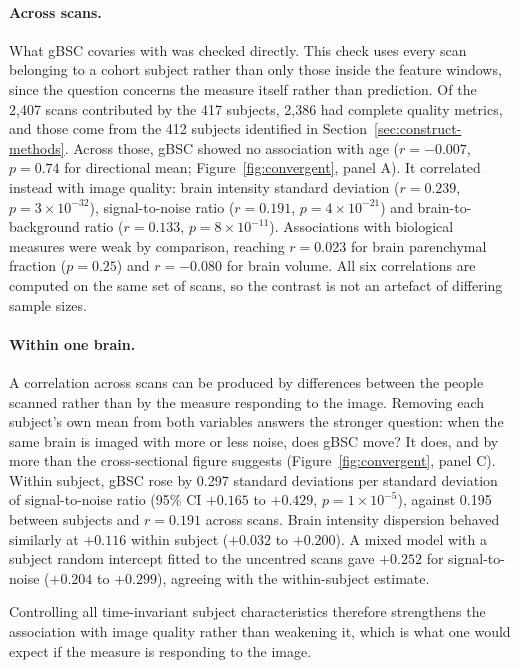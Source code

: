 \documentclass[blue]{ludusofficial}  %
\begin{document}
\paragraph{Across scans.} What gBSC covaries with was checked directly. This check uses every scan belonging to a cohort subject rather than only those inside the feature windows, since the question concerns the measure itself rather than prediction. Of the 2,407 scans contributed by the 417 subjects, 2,386 had complete quality metrics, and those come from the 412 subjects identified in Section~\ref{sec:construct-methods}. Across those, gBSC showed no association with age ($r = -0.007$, $p = 0.74$ for directional mean; Figure~\ref{fig:convergent}, panel A). It correlated instead with image quality: brain intensity standard deviation ($r = 0.239$, $p = 3\times10^{-32}$), signal-to-noise ratio ($r = 0.191$, $p = 4\times10^{-21}$) and brain-to-background ratio ($r = 0.133$, $p = 8\times10^{-11}$). Associations with biological measures were weak by comparison, reaching $r = 0.023$ for brain parenchymal fraction ($p = 0.25$) and $r = -0.080$ for brain volume. All six correlations are computed on the same set of scans, so the contrast is not an artefact of differing sample sizes.

\paragraph{Within one brain.} A correlation across scans can be produced by differences between the people scanned rather than by the measure responding to the image. Removing each subject's own mean from both variables answers the stronger question: when the same brain is imaged with more or less noise, does gBSC move? It does, and by more than the cross-sectional figure suggests (Figure~\ref{fig:convergent}, panel C). Within subject, gBSC rose by 0.297 standard deviations per standard deviation of signal-to-noise ratio (95\% CI $+0.165$ to $+0.429$, $p = 1\times10^{-5}$), against 0.195 between subjects and $r = 0.191$ across scans. Brain intensity dispersion behaved similarly at $+0.116$ within subject ($+0.032$ to $+0.200$). A mixed model with a subject random intercept fitted to the uncentred scans gave $+0.252$ for signal-to-noise ($+0.204$ to $+0.299$), agreeing with the within-subject estimate.

Controlling all time-invariant subject characteristics therefore strengthens the association with image quality rather than weakening it, which is what one would expect if the measure is responding to the image.
\end{document}
